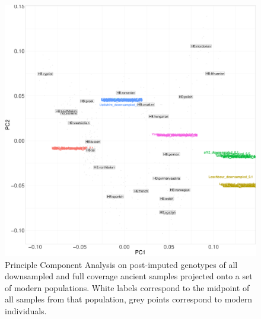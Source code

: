 \begin{figure}[htp]
    \centering
    \includegraphics[width=1.0\textwidth]{../images/chapter1/post_GLIMPSE_PCA.pdf}
    \caption{Principle Component Analysis on post-imputed genotypes of all downsampled and full coverage ancient samples projected onto a set of modern populations. White labels correspond to the midpoint of all samples from that population, grey points correspond to modern individuals.}
    \label{fig:post_GLIMPSE_PCA}
\end{figure}

